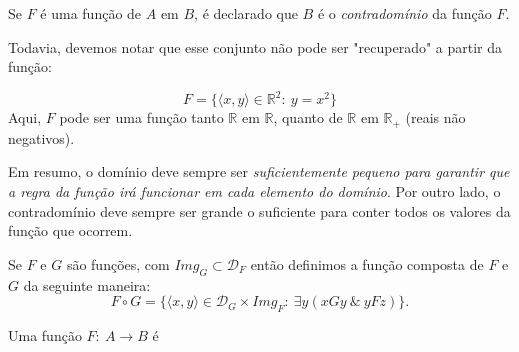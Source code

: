          \begin{definition}[Contradomínio]
            Se $F$ é uma função de $A$ em $B$, é declarado que $B$ é o \textit{contradomínio} da função $F$.  
         \end{definition}
         Todavia, devemos notar que esse conjunto não pode ser "recuperado" a partir da função:
         \begin{exmp}
            $$F = \{\langle x, y \rangle \in \mathbb{R}^{2}:\ y = x^{2}\}$$
            Aqui, $F$ pode ser uma função tanto $\mathbb{R}$ em $\mathbb{R}$, quanto de $\mathbb{R}$ em $\mathbb{R}_{+}$ (reais não negativos).
         \end{exmp}
         Em resumo, o domínio deve sempre ser \emph{suficientemente pequeno para garantir que a regra da função irá funcionar em cada elemento do domínio}. Por outro lado, o contradomínio deve sempre ser grande o suficiente para conter todos os valores da função que ocorrem.
         \begin{definition}[Composta]
            Se $F$ e $G$ são funções, com $\mathit{Img}_{G} \subset \mathcal{D}_{F}$ então definimos a função composta de $F$ e $G$ da seguinte maneira:
            $$ F \circ G = \{\langle x, y \rangle \in \mathcal{D}_{G} \times \mathit{Img}_{F}:\ \exists y (xGy\ \&\ yFz)\}.$$  
         \end{definition}
         \begin{center}
         \end{center}
         \begin{definition}[Natureza]
            Uma função $F:\ A \longrightarrow B$ é
         \end{definition}
